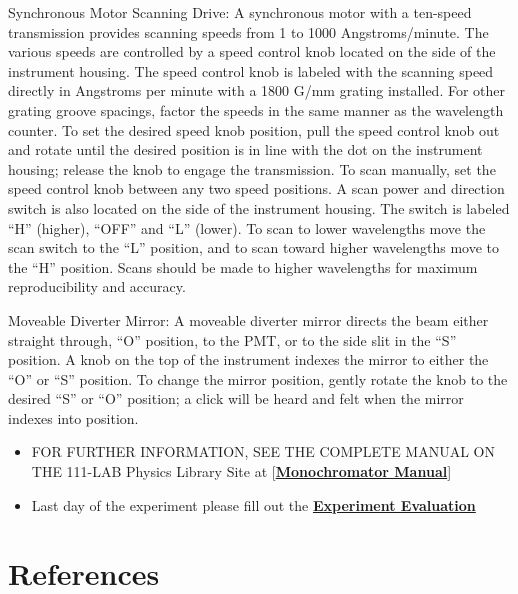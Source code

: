 \documentclass{../lab}
\begin{document}
Synchronous Motor Scanning Drive: A synchronous motor with a ten-speed transmission provides scanning speeds from 1 to 1000 Angstroms/minute. The various speeds are controlled by a speed control knob located on the side of the instrument housing. The speed control knob is labeled with the scanning speed directly in Angstroms per minute with a 1800 G/mm grating installed. For other grating groove spacings, factor the speeds in the same manner as the wavelength counter. To set the desired speed knob position, pull the speed control knob out and rotate until the desired position is in line with the dot on the instrument housing; release the knob to engage the transmission. To scan manually, set the speed control knob between any two speed positions. A scan power and direction switch is also located on the side of the instrument housing. The switch is labeled ``H'' (higher), ``OFF'' and ``L'' (lower). To scan to lower wavelengths move the scan switch to the ``L'' position, and to scan toward higher wavelengths move to the ``H'' position. Scans should be made to higher wavelengths for maximum reproducibility and accuracy.

Moveable Diverter Mirror: A moveable diverter mirror directs the beam either straight through, ``O'' position, to the PMT, or to the side slit in the ``S'' position. A knob on the top of the instrument indexes the mirror to either the ``O'' or ``S'' position. To change the mirror position, gently rotate the knob to the desired ``S'' or ``O'' position; a click will be heard and felt when the mirror indexes into position.

\begin{itemize}
    \item FOR FURTHER INFORMATION, SEE THE COMPLETE MANUAL ON THE 111-LAB Physics Library Site at [\href{http://physics111.lib.berkeley.edu/Physics111/Equipment\_Manuals/ATM\_Equipment\_Manuals/07-monochrometerAM505.pdf}{\textbf{Monochromator Manual}}]

    \item Last day of the experiment please fill out the \href{\ExperimentEvaluation}{\textbf{Experiment Evaluation}}

\end{itemize}

\section{References}
\label{sec:References}
\end{document}
